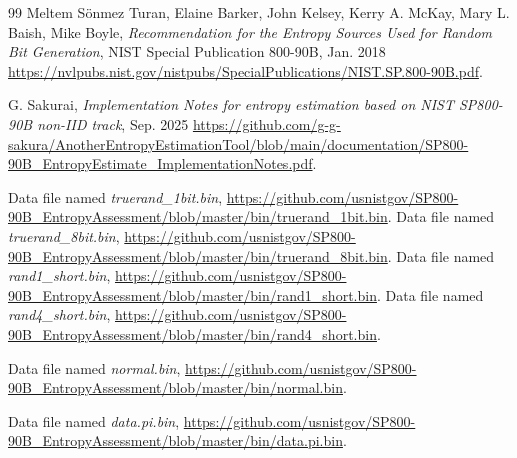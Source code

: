 \documentclass[a3paper,xelatex,english]{bxjsarticle}
\begin{document}
\addtocounter{section}{1}
\begin{thebibliography}{99}
Meltem S\"{o}nmez Turan,
Elaine Barker,
John Kelsey,
Kerry A. McKay,
Mary L. Baish,
Mike Boyle,
\textit{Recommendation for the Entropy Sources Used for Random Bit Generation},
NIST Special Publication 800-90B, Jan. 2018 
\url{https://nvlpubs.nist.gov/nistpubs/SpecialPublications/NIST.SP.800-90B.pdf}.

G. Sakurai, \textit{Implementation Notes for entropy estimation based on NIST SP800-90B non-IID track}, Sep. 2025 
\url{https://github.com/g-g-sakura/AnotherEntropyEstimationTool/blob/main/documentation/SP800-90B_EntropyEstimate_ImplementationNotes.pdf}.

Data file named \textit{truerand\_1bit.bin}, 
\url{https://github.com/usnistgov/SP800-90B_EntropyAssessment/blob/master/bin/truerand_1bit.bin}.
Data file named \textit{truerand\_8bit.bin},
\url{https://github.com/usnistgov/SP800-90B_EntropyAssessment/blob/master/bin/truerand_8bit.bin}.
Data file named \textit{rand1\_short.bin},
\url{https://github.com/usnistgov/SP800-90B_EntropyAssessment/blob/master/bin/rand1_short.bin}.
Data file named \textit{rand4\_short.bin},
\url{https://github.com/usnistgov/SP800-90B_EntropyAssessment/blob/master/bin/rand4_short.bin}.

Data file named \textit{normal.bin},
\url{https://github.com/usnistgov/SP800-90B_EntropyAssessment/blob/master/bin/normal.bin}.

Data file named \textit{data.pi.bin}, 
\url{https://github.com/usnistgov/SP800-90B_EntropyAssessment/blob/master/bin/data.pi.bin}.
\end{thebibliography}
\end{document}
